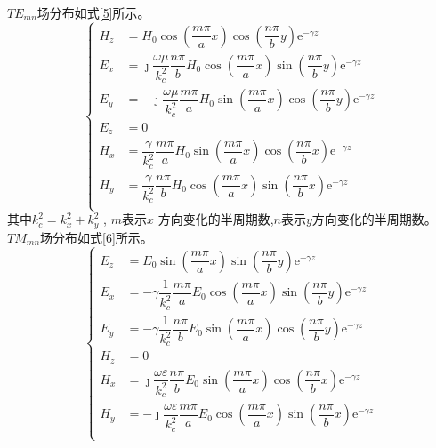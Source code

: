 $TE_{mn}$场分布如式\ref{5}所示。
\begin{equation}\label{5}
    \left\{
    \begin{aligned}
        H_z & =H_0\cos (\dfrac{m\pi}{a}x)\cos (\dfrac{n\pi}{b}y)\mathrm{e}^{-\gamma z}                                               \\[8pt]
        E_x & =\jmath\dfrac{\omega\mu}{k_c^2}\dfrac{n\pi}{b}H_0\cos (\dfrac{m\pi}{a}x)\sin (\dfrac{n\pi}{b}y)\mathrm{e}^{-\gamma z}  \\[8pt]
        E_y & =-\jmath\dfrac{\omega\mu}{k_c^2}\dfrac{m\pi}{a}H_0\sin (\dfrac{m\pi}{a}x)\cos (\dfrac{n\pi}{b}y)\mathrm{e}^{-\gamma z} \\[8pt]
        E_z & =0                                                                                                                     \\[8pt]
        H_x & =\dfrac{\gamma}{k_c^2}\dfrac{m\pi}{a}H_0\sin (\dfrac{m\pi}{a}x)\cos (\dfrac{n\pi}{b}x)\mathrm{e}^{-\gamma z}           \\[8pt]
        H_y & =\dfrac{\gamma}{k_c^2}\dfrac{n\pi}{b}H_0\cos (\dfrac{m\pi}{a}x)\sin (\dfrac{n\pi}{b}x)\mathrm{e}^{-\gamma z}           \\[8pt]
    \end{aligned}\right.
\end{equation}
其中$k_c^2=k_x^2+k_y^2$ , $m$表示$x$ 方向变化的半周期数,$n$表示$y$方向变化的半周期数。
$TM_{mn}$场分布如式\ref{6}所示。
\begin{equation}\label{6}
    \left\{
    \begin{aligned}
        E_z & =E_0\sin (\dfrac{m\pi}{a}x)\sin (\dfrac{n\pi}{b}y)\mathrm{e}^{-\gamma z}                                                       \\[8pt]
        E_x & =-\gamma\dfrac{1}{k_c^2}\dfrac{m\pi}{a}E_0\cos (\dfrac{m\pi}{a}x)\sin (\dfrac{n\pi}{b}y)\mathrm{e}^{-\gamma z}                 \\[8pt]
        E_y & =-\gamma\dfrac{1}{k_c^2}\dfrac{n\pi}{b}E_0\sin (\dfrac{m\pi}{a}x)\cos (\dfrac{n\pi}{b}y)\mathrm{e}^{-\gamma z}                 \\[8pt]
        H_z & =0                                                                                                                             \\[8pt]
        H_x & =\jmath\dfrac{\omega\varepsilon}{k_c^2}\dfrac{n\pi}{b}E_0\sin (\dfrac{m\pi}{a}x)\cos (\dfrac{n\pi}{b}x)\mathrm{e}^{-\gamma z}  \\[8pt]
        H_y & =-\jmath\dfrac{\omega\varepsilon}{k_c^2}\dfrac{m\pi}{a}E_0\cos (\dfrac{m\pi}{a}x)\sin (\dfrac{n\pi}{b}x)\mathrm{e}^{-\gamma z} \\[8pt]
    \end{aligned}\right.
\end{equation}

